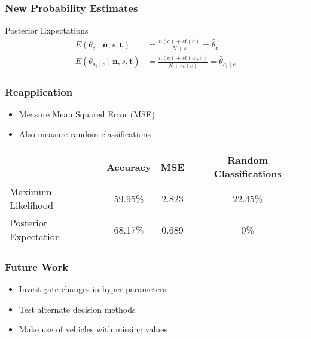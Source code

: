 \documentclass{beamer}
\begin{document}
\begin{frame}
	\frametitle{New Probability Estimates}
	\begin{block}{Posterior Expectations}
		\begin{align}
			E(\theta_c \mid \mathbf{n},s,\mathbf{t}) & = \frac{n(c) + st(c)}{N + s} = \hat{\theta}_c \\ E(\theta_{a_i \mid c} \mid \mathbf{n},s,\mathbf{t}) & = \frac{n(c) + st(a_i, c)}{N + st(c)} = \hat{\theta}_{a_i \mid c}
		\end{align}
	\end{block}
\end{frame}

\begin{frame}
	\frametitle{Reapplication}
	\begin{itemize}
		\item Measure Mean Squared Error (MSE)
		\item Also measure random classifications
	\end{itemize}
	\begin{tabular}{ l|c c c }
		              & Accuracy & MSE   & Random Classifications \\
		\hline
		Maximum Likelihood    & 59.95\%  & 2.823 & 22.45\%        \\
		Posterior Expectation & 68.17\%  & 0.689 & 0\%
	\end{tabular}
\end{frame}

\begin{frame}
	\frametitle{Future Work}
	\begin{itemize}
		\item Investigate changes in hyper parameters
		\item Test alternate decision methods
		\item Make use of vehicles with missing values
	\end{itemize}
\end{frame}
 
\end{document}

